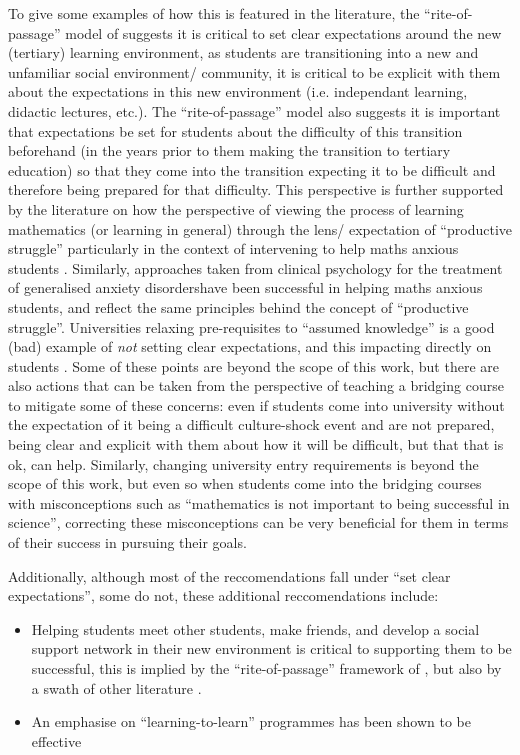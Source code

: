 \documentclass[twoside,12pt,a4paper]{report}
\begin{document}
To give some examples of how this is featured in the literature, the ``rite-of-passage'' model of  suggests it is critical to set clear expectations around the new (tertiary) learning environment, as students are transitioning into a new and unfamiliar social environment/ community, it is critical to be explicit with them about the expectations in this new environment (i.e. independant learning, didactic lectures, etc.). The ``rite-of-passage'' model also suggests it is important that expectations be set for students about the difficulty of this transition beforehand (in the years prior to them making the transition to tertiary education) so that they come into the transition expecting it to be difficult and therefore being prepared for that difficulty. This perspective is further supported by the literature on how the perspective of viewing the process of learning mathematics (or learning in general) through the lens/  expectation of ``productive struggle'' particularly in the context of intervening to help maths anxious students \cite{Wang2015, Lin-Siegler2016, Hiebert2007, Carlson1999}.  Similarly, approaches taken from clinical psychology for the treatment of generalised anxiety disordershave been successful in helping maths anxious students, and reflect the same principles behind the concept of ``productive struggle''. Universities relaxing pre-requisites to ``assumed knowledge'' is a good (bad) example of \emph{not} setting clear expectations, and this impacting directly on students \cite{Gordon2015}. Some of these points are beyond the scope of this work, but there are also actions that can be taken from the perspective of teaching a bridging course to mitigate some of these concerns: even if students come into university without the expectation of it being a difficult culture-shock event and are not prepared, being clear and explicit with them about how it will be difficult, but that that is ok, can help. Similarly, changing university entry requirements is beyond the scope of this work, but even so when students come into the bridging courses with misconceptions such as ``mathematics is not important to being successful in science'', correcting these misconceptions can be very beneficial for them in terms of their success in pursuing their goals.

Additionally, although most of the reccomendations fall under ``set clear expectations'', some do not, these additional reccomendations include:
\begin{itemize}
	\item Helping students meet other students, make friends, and develop a social support network in their new environment is critical to supporting them to be successful, this is implied by the ``rite-of-passage'' framework of \cite{Clark2008}, but also by a swath of other literature \cite{Trotter2006, Peat2001, Leese2010, Gordon2013}.
	\item An emphasise on ``learning-to-learn'' programmes has been shown to be effective \cite{Zeegers2001}
\end{itemize}
\end{document}

